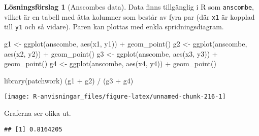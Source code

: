 \documentclass[
]{book}
\newenvironment{Shaded}{\begin{snugshade}}{\end{snugshade}}
\newcommand{\FunctionTok}[1]{\textcolor[rgb]{0.00,0.00,0.00}{#1}}
\newcommand{\NormalTok}[1]{#1}
\newcommand{\OtherTok}[1]{\textcolor[rgb]{0.56,0.35,0.01}{#1}}
\newcommand{\SpecialCharTok}[1]{\textcolor[rgb]{0.00,0.00,0.00}{#1}}
\theoremstyle{definition}
\theoremstyle{definition}
\theoremstyle{definition}
\theoremstyle{definition}
\newtheorem{hypothesis}{Lösningsförslag}[chapter]
\theoremstyle{remark}
\begin{document}
\begin{hypothesis}[Anscombes data]
Data finns tillgänglig i R som \texttt{anscombe}, vilket är en tabell med åtta kolumner som består av fyra par (där \texttt{x1} är kopplad till \texttt{y1} och så vidare). Paren kan plottas med enkla spridningsdiagram.

\begin{Shaded}
\begin{Highlighting}[]
\NormalTok{g1 }\OtherTok{\textless{}{-}} \FunctionTok{ggplot}\NormalTok{(anscombe, }\FunctionTok{aes}\NormalTok{(x1, y1)) }\SpecialCharTok{+} \FunctionTok{geom\_point}\NormalTok{()}
\NormalTok{g2 }\OtherTok{\textless{}{-}} \FunctionTok{ggplot}\NormalTok{(anscombe, }\FunctionTok{aes}\NormalTok{(x2, y2)) }\SpecialCharTok{+} \FunctionTok{geom\_point}\NormalTok{()}
\NormalTok{g3 }\OtherTok{\textless{}{-}} \FunctionTok{ggplot}\NormalTok{(anscombe, }\FunctionTok{aes}\NormalTok{(x3, y3)) }\SpecialCharTok{+} \FunctionTok{geom\_point}\NormalTok{()}
\NormalTok{g4 }\OtherTok{\textless{}{-}} \FunctionTok{ggplot}\NormalTok{(anscombe, }\FunctionTok{aes}\NormalTok{(x4, y4)) }\SpecialCharTok{+} \FunctionTok{geom\_point}\NormalTok{()}

\FunctionTok{library}\NormalTok{(patchwork)}
\NormalTok{(g1 }\SpecialCharTok{+}\NormalTok{ g2) }\SpecialCharTok{/}\NormalTok{ (g3 }\SpecialCharTok{+}\NormalTok{ g4)}
\end{Highlighting}
\end{Shaded}

\begin{center}\texttt{[image: R-anvisningar\_files/figure-latex/unnamed-chunk-216-1]} \end{center}

Graferna ser olika ut.

\begin{Shaded}
\end{Shaded}

\begin{verbatim}
## [1] 0.8164205
\end{verbatim}

\begin{Shaded}
\end{Shaded}


\end{hypothesis}
\end{document}
